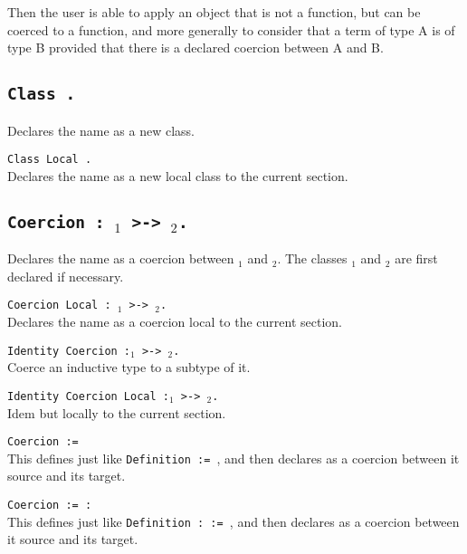 {\begin{coq_example}
Then the user is able to apply an
object that is not a function, but can be coerced to a function, and
more generally to consider that a term of type A is of type B provided
that there is a declared coercion between A and B.

\subsection{\tt Class {\ident}.}
Declares the name {\ident} as a new class.

\begin{Variant}
\item {\tt Class Local {\ident}.} \\
Declares the name {\ident} as a new local class to the current section.
\end{Variant}

\subsection{\tt Coercion {\ident} : {\ident$_1$} >-> {\ident$_2$}.}

Declares the name {\ident} as a coercion between {\ident$_1$} and
{\ident$_2$}. The classes {\ident$_1$} and {\ident$_2$} are first
declared if necessary.

\begin{Variants}
\item {\tt Coercion Local {\ident} : {\ident$_1$} >-> {\ident$_2$}.}\\
Declares the name {\ident} as a coercion local to the current section.

\item {\tt Identity Coercion {\ident}:{\ident$_1$} >->
    {\ident$_2$}.}\\
Coerce an inductive type to a subtype of it.

\item {\tt Identity Coercion Local {\ident}:{\ident$_1$} >-> {\ident$_2$}.} \\
Idem but locally to the current section.

\item {\tt Coercion {\ident} := {\term}}\\
  This defines {\ident} just like \texttt{Definition {\ident} :=
    {\term}}, and then declares {\ident} as a coercion between it
  source and its target.

\item {\tt Coercion {\ident} := {\term} : {\type}}\\
  This defines {\ident} just like 
  \texttt{Definition {\ident} : {\type} := {\term}}, and then
  declares {\ident} as a coercion between it source and its target. 


\end{Variants}
\end{coq_example}}
